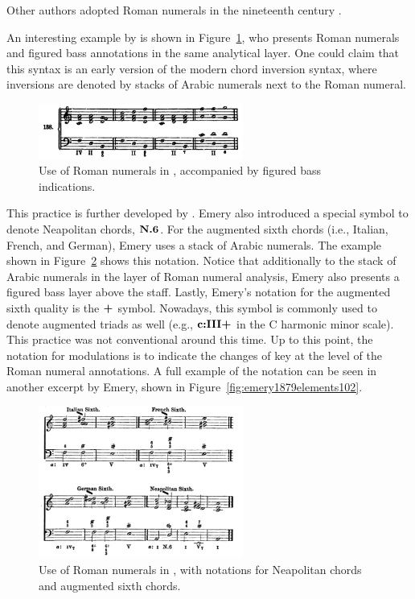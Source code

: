 Other authors adopted Roman numerals in the nineteenth century \parencite{sechter1853grundsatze, richter1860lehrbuch, tiersch1874elementarbuch, tracy1878theory}.

An interesting example by \textcite{bussler1878praktische} is shown in Figure~\ref{fig:bussler1878praktische063}, who presents Roman numerals and figured bass annotations in the same analytical layer.
One could claim that this syntax is an early version of the modern chord inversion syntax, where inversions are denoted by stacks of Arabic numerals next to the Roman numeral.

\begin{figure}[h!]
    \centering
    \includegraphics[width=0.6\textwidth]{figures/chapter/2/primary_sources/bussler1878praktische063.png}
    \caption{Use of Roman numerals in \textcite{bussler1878praktische}, accompanied by figured bass indications.}
    \label{fig:bussler1878praktische063}
\end{figure}

This practice is further developed by \textcite{emery1879elements}.
Emery also introduced a special symbol to denote Neapolitan chords, $\textbf{N.6}\relax\relax$.
For the augmented sixth chords (i.e., Italian, French, and German), Emery uses a stack of Arabic numerals.
The example shown in Figure~\ref{fig:emery1879elements051} shows this notation.
Notice that additionally to the stack of Arabic numerals in the layer of Roman numeral analysis, Emery also presents a figured bass layer above the staff.
Lastly, Emery's notation for the augmented sixth quality is the $\textbf{+}\relax\relax$ symbol.
Nowadays, this symbol is commonly used to denote augmented triads as well (e.g., $\textbf{c:III+}\relax\relax$ in the C harmonic minor scale).
This practice was not conventional around this time.
Up to this point, the notation for modulations is to indicate the changes of key at the level of the Roman numeral annotations.
A full example of the notation can be seen in another excerpt by Emery, shown in Figure~\ref{fig:emery1879elements102}.

\begin{figure}[h!]
    \centering
    \includegraphics[width=0.6\textwidth]{figures/chapter/2/primary_sources/emery1879elements051.png}
    \caption{Use of Roman numerals in \textcite{emery1879elements}, with notations for Neapolitan chords and augmented sixth chords.}
    \label{fig:emery1879elements051}
\end{figure}

